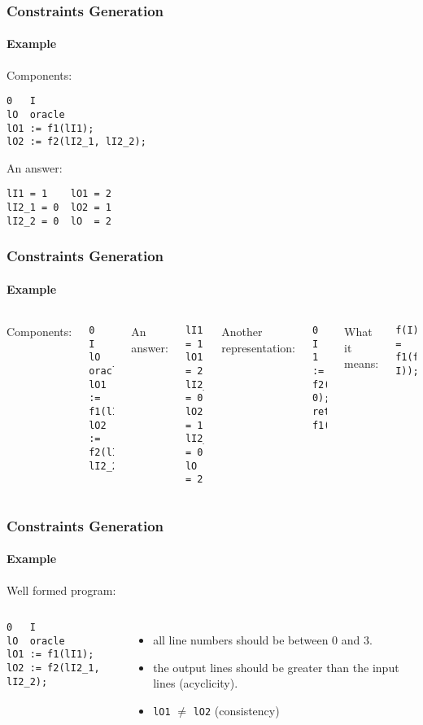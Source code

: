 \begin{frame}[fragile]
  \frametitle{Constraints Generation}
  \framesubtitle{Example}
  Components:
\begin{verbatim}
0   I
lO  oracle
lO1 := f1(lI1);
lO2 := f2(lI2_1, lI2_2);
\end{verbatim}
An answer:
\begin{verbatim}
lI1 = 1    lO1 = 2
lI2_1 = 0  lO2 = 1
lI2_2 = 0  lO  = 2
\end{verbatim}
\end{frame}

\begin{frame}[fragile]
  \frametitle{Constraints Generation}
  \framesubtitle{Example}
\begin{columns}
  Components:
\begin{verbatim}
0   I
lO  oracle
lO1 := f1(lI1);
lO2 := f2(lI2_1, lI2_2);
\end{verbatim}
An answer:
\begin{verbatim}
lI1 = 1    lO1 = 2
lI2_1 = 0  lO2 = 1
lI2_2 = 0  lO  = 2
\end{verbatim}
Another representation:
\begin{verbatim}
0 I
1 := f2(0, 0);
return f1(1);
\end{verbatim}
What it means:
\begin{verbatim}
f(I) = f1(f2(I, I));
\end{verbatim}
\end{columns}
\end{frame}

\begin{frame}[fragile]
  \frametitle{Constraints Generation}
  \framesubtitle{Example}
  Well formed program:
\begin{columns}
\begin{verbatim}
0   I
lO  oracle
lO1 := f1(lI1);
lO2 := f2(lI2_1, lI2_2);
\end{verbatim}
\begin{itemize}
 \item all line numbers should be between 0 and 3.
 \item the output lines should be greater than the input lines (acyclicity).
 \item \texttt{lO1} $\neq$ \texttt{lO2} (consistency)
\end{itemize}
\end{columns}
\end{frame}


